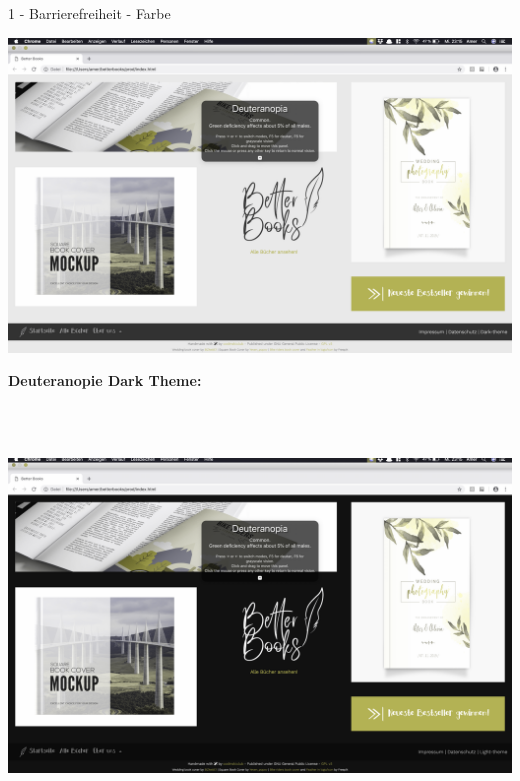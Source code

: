 \documentclass[a4paper]{article}
\begin{document}
\begin{exercise}{1 - Barrierefreiheit - Farbe}
\begin{center}
 \includegraphics[scale=0.5]{../8_bookstore_main_deuteranopie_light.png}
 \end{center}
\begin{Large}
\textbf{Deuteranopie Dark Theme:}
\end{Large}\\\\
\begin{center}
 \includegraphics[scale=0.5]{../9_bookstore_main_deuteranopie_dark.png}
 \end{center}


\end{exercise}
\newpage
\end{document}
